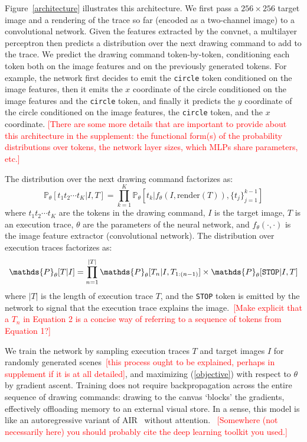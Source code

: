 \documentclass{article}
\newcommand{\probability}{\mathds{P}} %
\newcommand{\remark}[1]{\textcolor{red}{[#1]}}
\begin{document}
Figure~\ref{architecture} illustrates this architecture.  We first
pass a $256\times 256$ target image and a rendering of the trace so
far (encoded as a two-channel image) to a convolutional network. Given the features extracted by the
convnet, a multilayer perceptron then predicts a distribution over the
next drawing command to add to the trace.  We predict the drawing
command token-by-token, conditioning each token both on the image
features and on the previously generated tokens.  For example, the
network first decides to emit the \verb|circle| token conditioned on
the image features, then it emits the $x$ coordinate of the circle
conditioned on the image features and the \verb|circle| token, and
finally it predicts the $y$ coordinate of the circle conditioned on
the image features, the \verb|circle| token, and the $x$ coordinate.
\remark{There are some more details that are important to provide
  about this architecture in the supplement: the
  functional form(s) of the probability distributions over tokens, the
  network layer sizes, which MLPs share parameters, etc.}

The distribution over the next drawing command factorizes as:
\begin{equation}
  \probability_\theta [t_1t_2\cdots t_K | I,T] = \prod_{k = 1}^K \probability_\theta [t_k | f_\theta(I,\text{render}(T)), \{t_j\}_{j = 1}^{k - 1}]
\end{equation}
where $t_1t_2\cdots t_K$ are the tokens in the drawing command, $I$ is
the target image, $T$ is an execution trace, $\theta$ are the
parameters of the neural network, and $f_\theta(\cdot,\cdot)$ is the
image feature extractor (convolutional network). The distribution over
execution traces factorizes as:
\begin{equation}
  \probability_\theta [T|I] = \prod_{n = 1}^{|T|} \probability_\theta [T_n | I,T_{1:(n-1)}]\times\probability_\theta [\verb|STOP| | I,T]\label{objective}
\end{equation}
where $|T|$ is the length of execution trace $T$, and the \verb|STOP|
token is emitted by the network to signal that the execution trace
explains the image.~\remark{Make explicit that a $T_n$ in Equation 2 is a concise way of referring to a sequence of tokens from Equation 1?}

We train the network by sampling execution traces $T$ and target
images $I$ for randomly generated scenes~\remark{this process ought to be explained, perhaps in supplement if it is at all detailed}, and maximizing
(\ref{objective}) with respect to $\theta$ by gradient ascent.
Training does not require backpropagation across the entire sequence of drawing commands:
drawing to the canvas `blocks' the gradients,
effectively offloading memory to an external visual store.
In a sense, this model is like an autoregressive variant of AIR~\cite{eslami1603attend} without attention.
~\remark{Somewhere (not necessarily here) you should probably cite the deep learning toolkit you used.}
\end{document}

